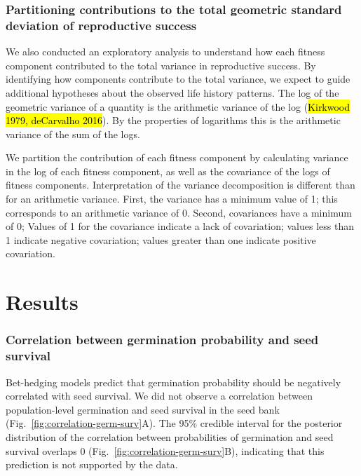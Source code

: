 \documentclass[12pt, oneside, titlepage]{article}   	%
\begin{document}
\subsubsection{Partitioning contributions to the total geometric standard deviation of reproductive success}

We also conducted an exploratory analysis to understand how each fitness component contributed to the total variance in reproductive success. By identifying how components contribute to the total variance, we expect to guide additional hypotheses about the observed life history patterns. The log of the geometric variance of a quantity is the arithmetic variance of the log (\hl{Kirkwood 1979, deCarvalho 2016}). By the properties of logarithms this is the arithmetic variance of the sum of the logs. 

We partition the contribution of each fitness component by calculating variance in the log of each fitness component, as well as the covariance of the logs of fitness components. Interpretation of the variance decomposition is different than for an arithmetic variance. First, the variance has a minimum value of 1; this corresponds to an arithmetic variance of 0. Second, covariances have a minimum of 0; Values of 1 for the covariance indicate a lack of covariation; values less than 1 indicate negative covariation; values greater than one indicate positive covariation. 

\section*{Results}

\subsubsection*{Correlation between germination probability and seed survival}

Bet-hedging models predict that germination probability should be negatively correlated with seed survival. We did not observe a correlation between population-level germination and seed survival in the seed bank (Fig.~\ref{fig:correlation-germ-surv}A). The 95\% credible interval for the posterior distribution of the correlation between probabilities of germination and seed survival overlaps 0 (Fig.~\ref{fig:correlation-germ-surv}B), indicating that this prediction is not supported by the data. 
\end{document}
